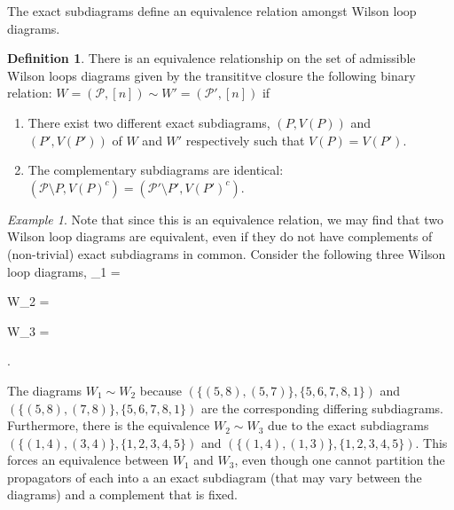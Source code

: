 \documentclass[11pt]{article}
\newcommand{\drawWLD}[2]{

\pgfmathsetmacro{\n}{#1}
\pgfmathsetmacro{\radius}{#2}
\pgfmathsetmacro{\angle}{360/\n}
\draw (0,0) circle (\radius);
    \foreach \i in {1,2,...,\n} {
      \draw (\angle*\i:\radius) node {$\bullet$};
    }

}
\newcommand{\drawprop}[4]{
\pgfmathsetmacro{\r}{#1}
\pgfmathsetmacro{\bumpr}{#2}
\pgfmathsetmacro{\s}{#3}
\pgfmathsetmacro{\bumps}{#4}
\pgfmathsetmacro{\perturbe}{\angle/\n}

\begin{scope}
\draw[propagator] (\angle*\r + \angle/2 + \bumpr*\perturbe:\radius) -- (\angle*\s + \angle/2 + \bumps*\perturbe:\radius);
\end{scope}
}
\newcommand{\drawnumbers}{
  \foreach \i in {1,2,...,\n} {
  \pgfmathsetmacro{\x}{\angle*\i}
  \draw (\x:\radius*1.15) node {\footnotesize \i};
}
}
\def\bas #1\eas{\begin{align*} #1 \end{align*}}
\newcommand{\cP}{\mathcal{P}}
\theoremstyle{remark}
\newtheorem{eg}[thm]{Example}
\theoremstyle{definition}
\newtheorem{dfn}[thm]{Definition}
\begin{document}
The exact subdiagrams define an equivalence relation amongst Wilson loop diagrams.

\begin{dfn}\label{equivdfn} 
There is an equivalence relationship on the set of admissible Wilson loops diagrams given by the transititve closure the following binary relation: $W = (\cP, [n]) \sim W'= (\cP', [n])$ if
\begin{enumerate}
\item There exist two different exact subdiagrams, $(P, V(P))$ and $(P', V(P'))$ of $W$ and $W'$ respectively such that $V(P) =  V(P')$.
\item The complementary subdiagrams are identical: $(\cP \setminus P, V(P)^c) = (\cP' \setminus P', V(P')^c)$.
\end{enumerate}
\end{dfn}

\begin{eg} \label{eg:equivdiags}
Note that since this is an equivalence relation, we may find that two Wilson loop diagrams are equivalent, even if they do not have complements of (non-trivial) exact subdiagrams in common. Consider the following three Wilson loop diagrams,
\bas
W_1 =  \quad
W_2 =  \quad
W_3 =  .
\eas


The diagrams $W_1 \sim W_2$ because $(\{(5,8), (5,7)\}, \{5,6,7,8,1\})$ and $(\{(5,8), (7,8)\}, \{5,6,7,8,1\})$ are the corresponding differing subdiagrams. Furthermore, there is the equivalence $W_2 \sim W_3$ due to the exact subdiagrams $(\{(1,4), (3,4)\}, \{1,2,3,4,5\})$ and $(\{(1,4), (1,3)\}, \{1,2,3,4,5\})$. This forces an equivalence between $W_1$ and $W_3$, even though one cannot partition the propagators of each into a an exact subdiagram (that may vary between the diagrams) and a complement that is fixed.  \end{eg}
\end{document}
